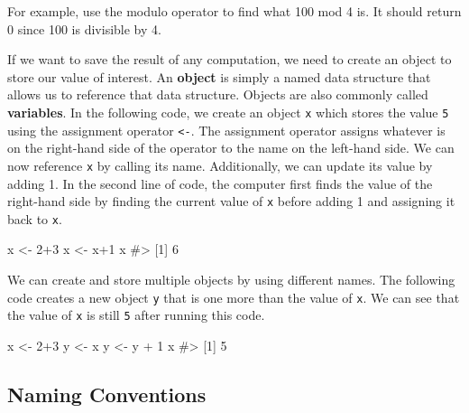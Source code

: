 \documentclass[
  letterpaper,
]{latex/krantz}
\makeatletter
\newenvironment{Shaded}{\begin{snugshade}}{\end{snugshade}}
\newcommand{\CommentTok}[1]{\textcolor[rgb]{0.37,0.37,0.37}{#1}}
\newcommand{\DecValTok}[1]{\textcolor[rgb]{0.68,0.00,0.00}{#1}}
\newcommand{\NormalTok}[1]{\textcolor[rgb]{0.00,0.23,0.31}{#1}}
\newcommand{\OtherTok}[1]{\textcolor[rgb]{0.00,0.23,0.31}{#1}}
\newcommand{\SpecialCharTok}[1]{\textcolor[rgb]{0.37,0.37,0.37}{#1}}
\newenvironment{kframe}{%
\medskip{}
\setlength{\fboxsep}{.8em}
 \def\at@end@of@kframe{}%
 \ifinner\ifhmode%
  \def\at@end@of@kframe{\end{minipage}}%
  \begin{minipage}{\columnwidth}%
 \fi\fi%
 \def\FrameCommand##1{\hskip\@totalleftmargin \hskip-\fboxsep
 \colorbox{shadecolor}{##1}\hskip-\fboxsep
     \hskip-\linewidth \hskip-\@totalleftmargin \hskip\columnwidth}%
 \MakeFramed {\advance\hsize-\width
   \@totalleftmargin\z@ \linewidth\hsize
   \@setminipage}}%
 {\par\unskip\endMakeFramed%
 \at@end@of@kframe}
\renewenvironment{Shaded}{\begin{kframe}}{\end{kframe}}
\makeatother
\begin{document}
For example, use the modulo operator to find what 100 mod 4 is. It
should return 0 since 100 is divisible by 4.

If we want to save the result of any computation, we need to create an
object to store our value of interest. An \textbf{object}
is simply a named data structure that allows us to reference that data
structure. Objects are also commonly called
\textbf{variables}. In the following code, we create an
object \texttt{x} which stores the value \texttt{5} using the assignment
operator \texttt{\textless{}-}. The
assignment operator assigns whatever is on the right-hand side of the
operator to the name on the left-hand side. We can now reference
\texttt{x} by calling its name. Additionally, we can update its value by
adding 1. In the second line of code, the computer first finds the value
of the right-hand side by finding the current value of \texttt{x} before
adding 1 and assigning it back to \texttt{x}.

\begin{Shaded}
\begin{Highlighting}[]
\NormalTok{x }\OtherTok{\textless{}{-}} \DecValTok{2}\SpecialCharTok{+}\DecValTok{3}
\NormalTok{x }\OtherTok{\textless{}{-}}\NormalTok{ x}\SpecialCharTok{+}\DecValTok{1}
\NormalTok{x}
\CommentTok{\#\textgreater{} [1] 6}
\end{Highlighting}
\end{Shaded}

We can create and store multiple objects by using different names. The
following code creates a new object \texttt{y} that is one more than the
value of \texttt{x}. We can see that the value of \texttt{x} is still
\texttt{5} after running this code.

\begin{Shaded}
\begin{Highlighting}[]
\NormalTok{x }\OtherTok{\textless{}{-}} \DecValTok{2}\SpecialCharTok{+}\DecValTok{3}
\NormalTok{y }\OtherTok{\textless{}{-}}\NormalTok{ x}
\NormalTok{y }\OtherTok{\textless{}{-}}\NormalTok{ y }\SpecialCharTok{+} \DecValTok{1}
\NormalTok{x}
\CommentTok{\#\textgreater{} [1] 5}
\end{Highlighting}
\end{Shaded}

\subsection{Naming Conventions}\label{naming-conventions}
\end{document}
